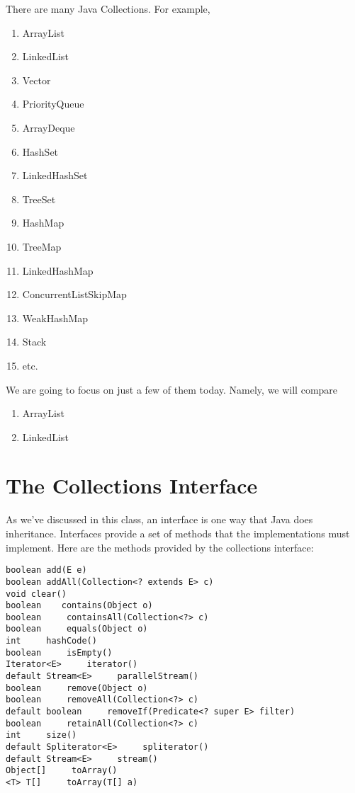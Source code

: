 \documentclass[12pt]{article}
\begin{document}
There are many Java Collections. For example, 

\begin{enumerate}
\item ArrayList
\item LinkedList
\item Vector
\item PriorityQueue
\item ArrayDeque
\item HashSet
\item LinkedHashSet
\item TreeSet
\item HashMap
\item TreeMap
\item LinkedHashMap
\item ConcurrentListSkipMap
\item WeakHashMap
\item Stack
\item etc.
\end{enumerate}

We are going to focus on just a few of them today. Namely, we will compare

\begin{enumerate}
\item ArrayList
\item LinkedList
\end{enumerate}


\section{The Collections Interface}
As we've discussed in this class, an interface is one way that Java does
inheritance. Interfaces provide a set of methods that the implementations must
implement. Here are the methods provided by the collections interface:

\begin{lstlisting}
boolean add(E e)
boolean addAll(Collection<? extends E> c)
void clear()
boolean    contains(Object o)
boolean     containsAll(Collection<?> c)
boolean     equals(Object o)
int     hashCode()
boolean     isEmpty()
Iterator<E>     iterator()
default Stream<E>     parallelStream()
boolean     remove(Object o)
boolean     removeAll(Collection<?> c)
default boolean     removeIf(Predicate<? super E> filter)
boolean     retainAll(Collection<?> c)
int     size()
default Spliterator<E>     spliterator()
default Stream<E>     stream()
Object[]     toArray()
<T> T[]     toArray(T[] a)
\end{lstlisting}
\end{document}
